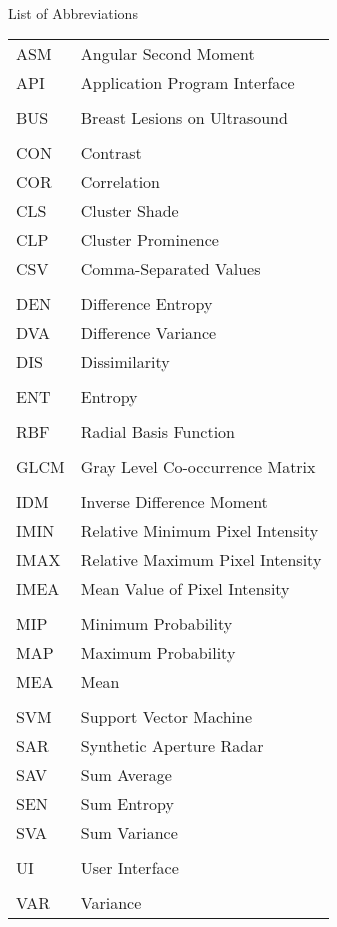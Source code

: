 
\renewcommand{\baselinestretch}{1}
\small\normalsize
\hbox{\ }

\vspace{-4em}

\begin{center}
\large{List of Abbreviations}
\end{center} 

\vspace{3pt}

\begin{tabular}{ll}
ASM & Angular Second Moment \\
API & Application Program Interface\\
\\
BUS & Breast Lesions on Ultrasound \\
\\
CON & Contrast \\
COR & Correlation \\
CLS & Cluster Shade \\
CLP & Cluster Prominence \\
CSV & Comma-Separated Values\\
\\
DEN & Difference Entropy \\
DVA & Difference Variance \\
DIS & Dissimilarity \\

\\
ENT & Entropy \\
\\
RBF & Radial Basis Function \\
\\
GLCM & Gray Level Co-occurrence Matrix\\
\\
IDM & Inverse Difference Moment \\
IMIN & Relative Minimum Pixel Intensity\\
IMAX & Relative Maximum Pixel Intensity\\
IMEA & Mean Value of Pixel Intensity\\
\\
MIP & Minimum Probability \\
MAP & Maximum Probability \\
MEA & Mean \\
\\
SVM & Support Vector Machine \\
SAR & Synthetic Aperture Radar\\
SAV & Sum Average \\
SEN & Sum Entropy \\
SVA & Sum Variance \\
\\
UI & User Interface \\
\\
VAR & Variance 
\end{tabular}
